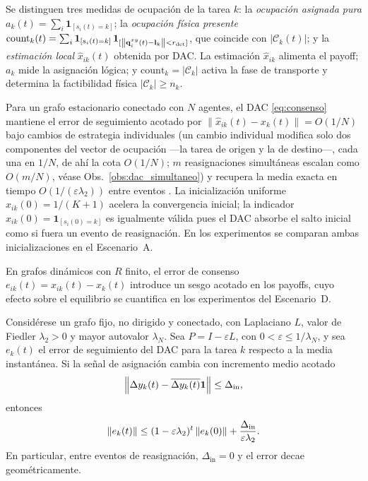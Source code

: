 Se distinguen tres medidas de ocupación de la tarea $k$: la \emph{ocupación
asignada pura} $a_k(t) = \sum_i \mathbf{1}_{[s_i(t)=k]}$; la \emph{ocupación física
presente} $\mathrm{count}_k(t) = \sum_i \mathbf{1}_{[s_i(t)=k]}\,
\mathbf{1}_{[\left\|\mathbf{q}_i^{xy}(t)-\mathbf{l}_k\right\|<r_{\mathrm{det}}]}$, que coincide
con $|\mathcal{C}_k(t)|$; y la \emph{estimación local} $\hat{x}_{ik}(t)$ obtenida por
DAC. La estimación $\hat{x}_{ik}$ alimenta el payoff; $a_k$ mide la asignación lógica;
y $\mathrm{count}_k = |\mathcal{C}_k|$ activa la fase de transporte y determina la
factibilidad física $|\mathcal{C}_k| \geq n_k$.

\begin{observacion}
\label{obs:init_obs}
Para un grafo estacionario conectado con $N$ agentes, el DAC \eqref{eq:consenso}
mantiene el error de seguimiento acotado por $\|\hat{x}_{ik}(t) - x_k(t)\| = O(1/N)$
bajo cambios de estrategia individuales (un cambio individual modifica solo dos
componentes del vector de ocupación —la tarea de origen y la de destino—, cada una en
$1/N$, de ahí la cota $O(1/N)$; $m$ reasignaciones simultáneas escalan como $O(m/N)$,
véase Obs.~\ref{obs:dac_simultaneo}) y recupera la media exacta en tiempo
$O(1/(\varepsilon\lambda_2))$ entre eventos \citep{kia2019tutorial}.
La inicialización uniforme $\hat{x}_{ik}(0) = 1/(K+1)$ acelera la convergencia inicial;
la indicador $\hat{x}_{ik}(0) = \mathbf{1}_{[s_i(0)=k]}$ es igualmente válida
pues el DAC absorbe el salto inicial como si fuera un evento de reasignación.
En los experimentos se comparan ambas inicializaciones en el Escenario~A.
\end{observacion}
En grafos dinámicos con $R$ finito, el error de consenso $e_{ik}(t) = \hat{x}_{ik}(t)
- x_k(t)$ introduce un sesgo acotado en los payoffs, cuyo efecto sobre el equilibrio
se cuantifica en los experimentos del Escenario~D.

\begin{lema}
\label{lema:dac_finito}
Considérese un grafo fijo, no dirigido y conectado, con Laplaciano $L$, valor de
Fiedler $\lambda_2>0$ y mayor autovalor $\lambda_N$. Sea $P=I-\varepsilon L$, con
$0<\varepsilon\le1/\lambda_N$, y sea $e_k(t)$ el error de seguimiento del DAC para la
tarea $k$ respecto a la media instantánea. Si la señal de asignación cambia con
incremento medio acotado
\[
  \left\|\Delta y_k(t)-\overline{\Delta y_k(t)}\mathbf{1}\right\|\le \Delta_{\mathrm{in}},
\]
entonces
\begin{equation}
  \left\|e_k(t)\right\|
  \le
  (1-\varepsilon\lambda_2)^t\left\|e_k(0)\right\|
  +
  \frac{\Delta_{\mathrm{in}}}{\varepsilon\lambda_2}.
  \label{eq:dac_cota_finita}
\end{equation}
En particular, entre eventos de reasignación, $\Delta_{\mathrm{in}}=0$ y el error
decae geométricamente.
\end{lema}

